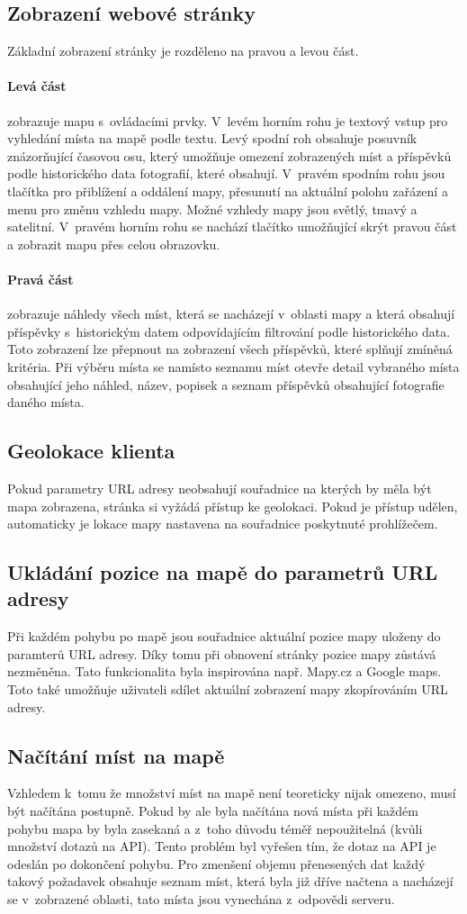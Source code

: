 \documentclass[12pt, a4paper,
  oneside,      %
]{report}
\begin{document}
\subsection{Zobrazení webové stránky}
Základní zobrazení stránky je rozděleno na pravou a levou část.
\paragraph{Levá část} zobrazuje mapu s~ovládacími prvky. V~levém horním rohu je textový vstup pro vyhledání místa na mapě podle textu. Levý spodní roh obsahuje posuvník znázorňující časovou osu, který umožňuje omezení zobrazených míst a příspěvků podle historického data fotografií, které obsahují. V~pravém spodním rohu jsou tlačítka pro přiblížení a oddálení mapy, přesunutí na aktuální polohu zařázení a menu pro změnu vzhledu mapy. Možné vzhledy mapy jsou světlý, tmavý a satelitní. V~pravém horním rohu se nachází tlačítko umožňující skrýt pravou část a zobrazit mapu přes celou obrazovku.
\paragraph{Pravá část} zobrazuje náhledy všech míst, která se nacházejí v~oblasti mapy a která obsahují příspěvky s~historickým datem odpovídajícím filtrování podle historického data. Toto zobrazení lze přepnout na zobrazení všech příspěvků, které splňují zmíněná kritéria. Při výběru místa se namísto seznamu míst otevře detail vybraného místa obsahující jeho náhled, název, popisek a seznam příspěvků obsahující fotografie daného místa.
\subsection{Geolokace klienta} Pokud parametry URL adresy neobsahují souřadnice na kterých by měla být mapa zobrazena, stránka si vyžádá přístup ke geolokaci. Pokud je přístup udělen, automaticky je lokace mapy nastavena na souřadnice poskytnuté prohlížečem.
\subsection{Ukládání pozice na mapě do parametrů URL adresy}
Při každém pohybu po mapě jsou souřadnice aktuální pozice mapy uloženy do paramterů URL adresy. Díky tomu při obnovení stránky pozice mapy zůstává nezměněna. Tato funkcionalita byla inspirována např. Mapy.cz a Google maps. Toto také umožňuje uživateli sdílet aktuální zobrazení mapy zkopírováním URL adresy.
\subsection{Načítání míst na mapě}
Vzhledem k~tomu že množství míst na mapě není teoreticky nijak omezeno, musí být načítána postupně. Pokud by ale byla načítána nová místa při každém pohybu mapa by byla zasekaná a z~toho důvodu téměř nepoužitelná (kvůli množství dotazů na API). Tento problém byl vyřešen tím, že dotaz na API je odeslán po dokončení pohybu. Pro zmenšení objemu přenesených dat každý takový požadavek obsahuje seznam míst, která byla již dříve načtena a nacházejí se v~zobrazené oblasti, tato místa jsou vynechána z~odpovědi serveru.
\end{document}
